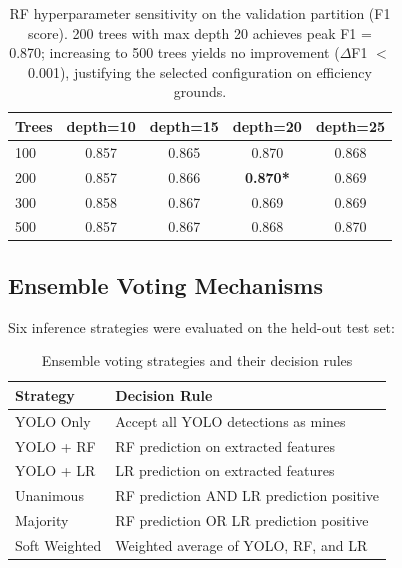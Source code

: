 \documentclass[conference]{IEEEtran}
\begin{document}
\begin{table}[t]
  \centering
  \caption{RF hyperparameter sensitivity on the validation partition (F1 score). 200 trees with max depth 20 achieves peak F1 = 0.870; increasing to 500 trees yields no improvement ($\Delta$F1 $<$ 0.001), justifying the selected configuration on efficiency grounds.}
  \label{tab:rf_ablation}
  \begin{tabular}{lcccc}
    \hline
    \textbf{Trees} & \textbf{depth=10} & \textbf{depth=15} & \textbf{depth=20} & \textbf{depth=25} \\
    \hline
    100   & 0.857 & 0.865 & 0.870 & 0.868 \\
    200   & 0.857 & 0.866 & \textbf{0.870*} & 0.869 \\
    300   & 0.858 & 0.867 & 0.869 & 0.869 \\
    500   & 0.857 & 0.867 & 0.868 & 0.870 \\
    \hline
  \end{tabular}
  \vspace{2pt}
  \par{}
\end{table}

\subsection{Ensemble Voting Mechanisms}

Six inference strategies were evaluated on the held-out test set:

\begin{table}[t]
  \centering
  \caption{Ensemble voting strategies and their decision rules}
  \label{tab:strategies}
  \begin{tabular}{ll}
    \hline
    \textbf{Strategy} & \textbf{Decision Rule} \\
    \hline
    YOLO Only & Accept all YOLO detections as mines \\
    YOLO + RF & RF prediction on extracted features \\
    YOLO + LR & LR prediction on extracted features \\
    Unanimous & RF prediction AND LR prediction positive \\
    Majority & RF prediction OR LR prediction positive \\
    Soft Weighted & Weighted average of YOLO, RF, and LR \\
    \hline
  \end{tabular}
\end{table}
\end{document}
